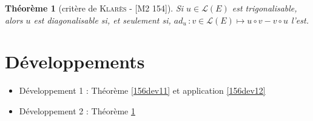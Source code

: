 \documentclass[10pt, a4paper, parskip=full, twoside, twocolumn]{report}
\newtheorem{theorem}[definition]{Théorème}
\begin{document}
\begin{tcolorbox}[
    breakable, %
    colback=developpement, %
    colframe=gray!0!black, %
    boxrule=0pt, %
    arc=1mm, %
	boxsep=0pt,
	left=0pt, right=0pt, top=0pt, bottom=0pt
]
\begin{theorem}[critère de \textsc{Klarès} - \textnormal{[M2 154]}]
	\label{156dev2}
	Si $u\in \mathcal{L}(E)$ est trigonalisable, alors $u$ est diagonalisable si, et seulement si, $ad_u\,\colon v\in\mathcal{L}(E)\mapsto u\circ v - v\circ u$ l'est.
\end{theorem}
\end{tcolorbox}

\section*{Développements}
\begin{itemize}
	\item Développement 1 : Théorème \ref{156dev11} et application \ref{156dev12}
	\item Développement 2 : Théorème \ref{156dev2}
\end{itemize}
\end{document}
